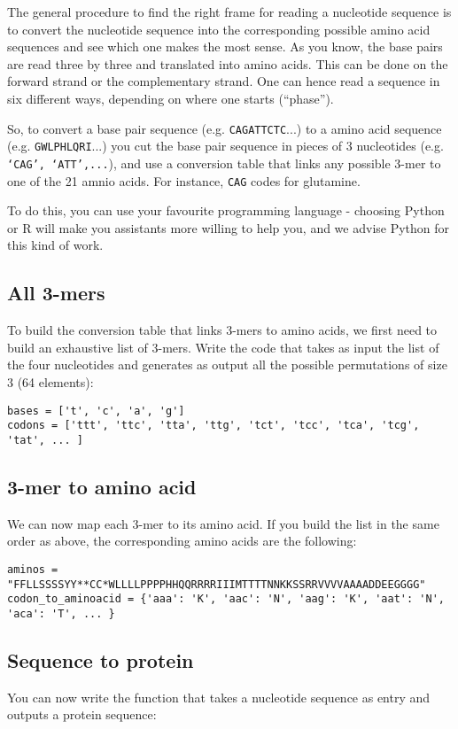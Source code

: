\documentclass[a4paper,11pt]{article}
\begin{document}
The general procedure to find the right frame for reading a nucleotide sequence is to convert the nucleotide sequence into the corresponding possible amino acid sequences and see which one makes the most sense. As you know, the base pairs are read three by three and translated into amino acids. This can be done on the forward strand or the complementary strand. One can hence read a sequence in six different ways, depending on where one starts (``phase'').

So, to convert a base pair sequence (e.g. \texttt{CAGATTCTC}...) to a amino acid sequence (e.g. \texttt{GWLPHLQRI}...) you cut the base pair sequence in pieces of 3 nucleotides (e.g. \texttt{`CAG', `ATT',...}), and use a conversion table that links any possible 3-mer to one of the 21 amnio acids. For instance, \texttt{CAG} codes for glutamine.

To do this, you can use your favourite programming language - choosing Python or R will make you assistants more willing to help you, and we advise Python for this kind of work.

\subsection{All 3-mers}
To build the conversion table that links 3-mers to amino acids, we first need to build an exhaustive list of 3-mers. Write the code that takes as input the list of the four nucleotides and generates as output all the possible permutations of size 3 (64 elements):
	
\begin{verbatim}
bases = ['t', 'c', 'a', 'g']
codons = ['ttt', 'ttc', 'tta', 'ttg', 'tct', 'tcc', 'tca', 'tcg', 'tat', ... ]
\end{verbatim}

\subsection{3-mer to amino acid}
We can now map each 3-mer to its amino acid. If you build the list in the same order as above, the corresponding amino acids are the following:

\begin{verbatim}
aminos = "FFLLSSSSYY**CC*WLLLLPPPPHHQQRRRRIIIMTTTTNNKKSSRRVVVVAAAADDEEGGGG"
codon_to_aminoacid = {'aaa': 'K', 'aac': 'N', 'aag': 'K', 'aat': 'N', 'aca': 'T', ... }
\end{verbatim}

\subsection{Sequence to protein}
You can now write the function that takes a nucleotide sequence as entry and outputs a protein sequence:
\end{document}
